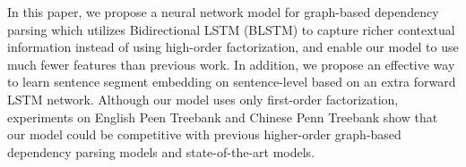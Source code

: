 In this paper, we propose a neural network model for graph-based dependency parsing which utilizes Bidirectional LSTM (BLSTM) to capture richer contextual information instead of using high-order factorization, and enable our model to use much fewer features than previous work. In addition, we propose an effective way to learn sentence segment embedding on sentence-level based on an extra forward LSTM network. Although our model uses only first-order factorization, experiments on English Peen Treebank and Chinese Penn Treebank show that our model could be competitive with previous higher-order graph-based dependency parsing models and state-of-the-art models.
